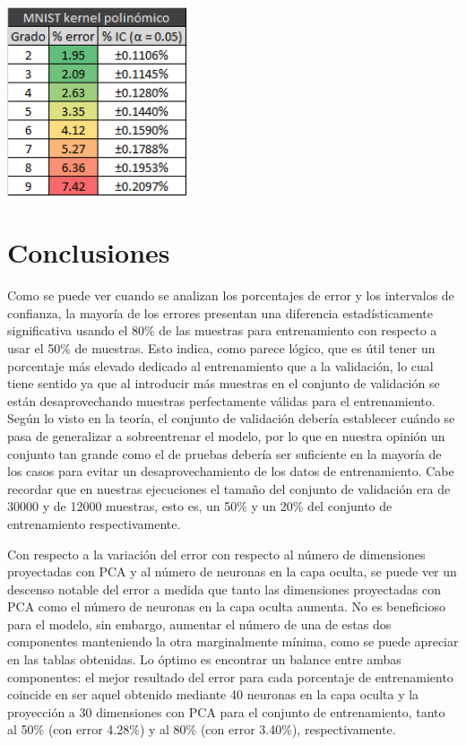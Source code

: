 \documentclass[a4paper]{article}
\begin{document}
\begin{center}
\includegraphics[width=200px]{2_mnist}
\end{center}

\section{Conclusiones}
\quad Como se puede ver cuando se analizan los porcentajes de error y los intervalos de confianza, la mayoría de los errores presentan una diferencia estadísticamente significativa usando el 80\% de las muestras para entrenamiento con respecto a usar el 50\% de muestras. Esto indica, como parece lógico, que es útil tener un porcentaje más elevado dedicado al entrenamiento que a la validación, lo cual tiene sentido ya que al introducir más muestras en el conjunto de validación se están desaprovechando muestras perfectamente válidas para el entrenamiento. Según lo visto en la teoría, el conjunto de validación debería establecer cuándo se pasa de generalizar a sobreentrenar el modelo, por lo que en nuestra opinión un conjunto tan grande como el de pruebas debería ser suficiente en la mayoría de los casos para evitar un desaprovechamiento de los datos de entrenamiento. Cabe recordar que en nuestras ejecuciones el tamaño del conjunto de validación era de 30000 y de 12000 muestras, esto es, un 50\% y un 20\% del conjunto de entrenamiento respectivamente.

\quad Con respecto a la variación del error con respecto al número de dimensiones proyectadas con PCA y al número de neuronas en la capa oculta, se puede ver un descenso notable del error a medida que tanto las dimensiones proyectadas con PCA como el número de neuronas en la capa oculta aumenta. No es beneficioso para el modelo, sin embargo, aumentar el número de una de estas dos componentes manteniendo la otra marginalmente mínima, como se puede apreciar en las tablas obtenidas. Lo óptimo es encontrar un balance entre ambas componentes: el mejor resultado del error para cada porcentaje de entrenamiento coincide en ser aquel obtenido mediante 40 neuronas en la capa oculta y la proyección a 30 dimensiones con PCA para el conjunto de entrenamiento, tanto al 50\% (con error 4.28\%) y al 80\% (con error 3.40\%), respectivamente.
\end{document}
